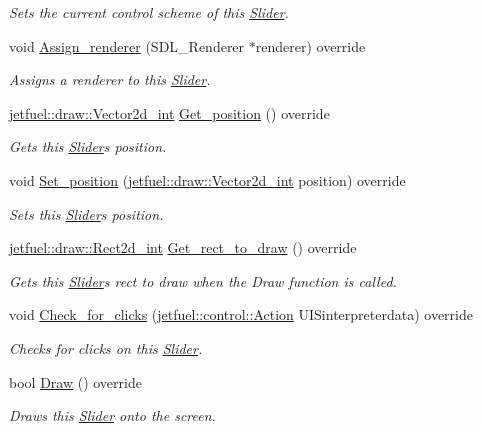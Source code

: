 \begin{DoxyCompactItemize}
\begin{DoxyCompactList}\small\item\em Sets the current control scheme of this \hyperlink{classjetfuel_1_1gui_1_1Slider}{Slider}. \end{DoxyCompactList}\item 
void \hyperlink{classjetfuel_1_1gui_1_1Slider_af9ceba04fec0f7cdc097ea0513094176}{Assign\+\_\+renderer} (S\+D\+L\+\_\+\+Renderer $\ast$renderer) override
\begin{DoxyCompactList}\small\item\em Assigns a renderer to this \hyperlink{classjetfuel_1_1gui_1_1Slider}{Slider}. \end{DoxyCompactList}\item 
\hyperlink{classjetfuel_1_1draw_1_1Vector2d}{jetfuel\+::draw\+::\+Vector2d\+\_\+int} \hyperlink{classjetfuel_1_1gui_1_1Slider_a2b177c832a42ad21ca1fa88496ef7551}{Get\+\_\+position} () override
\begin{DoxyCompactList}\small\item\em Gets this \hyperlink{classjetfuel_1_1gui_1_1Slider}{Slider}\textquotesingle{}s position. \end{DoxyCompactList}\item 
void \hyperlink{classjetfuel_1_1gui_1_1Slider_a11721a72699e9d1cdd0f6e5709f003e4}{Set\+\_\+position} (\hyperlink{classjetfuel_1_1draw_1_1Vector2d}{jetfuel\+::draw\+::\+Vector2d\+\_\+int} position) override
\begin{DoxyCompactList}\small\item\em Sets this \hyperlink{classjetfuel_1_1gui_1_1Slider}{Slider}\textquotesingle{}s position. \end{DoxyCompactList}\item 
\hyperlink{classjetfuel_1_1draw_1_1Rect2d}{jetfuel\+::draw\+::\+Rect2d\+\_\+int} \hyperlink{classjetfuel_1_1gui_1_1Slider_abab31dbe01b716b4e82919f0d8aba96c}{Get\+\_\+rect\+\_\+to\+\_\+draw} () override
\begin{DoxyCompactList}\small\item\em Gets this \hyperlink{classjetfuel_1_1gui_1_1Slider}{Slider}\textquotesingle{}s rect to draw when the Draw function is called. \end{DoxyCompactList}\item 
void \hyperlink{classjetfuel_1_1gui_1_1Slider_a8a1e83cfea8d65db34da7447dce9fb6f}{Check\+\_\+for\+\_\+clicks} (\hyperlink{structjetfuel_1_1control_1_1Action}{jetfuel\+::control\+::\+Action} U\+I\+Sinterpreterdata) override
\begin{DoxyCompactList}\small\item\em Checks for clicks on this \hyperlink{classjetfuel_1_1gui_1_1Slider}{Slider}. \end{DoxyCompactList}\item 
bool \hyperlink{classjetfuel_1_1gui_1_1Slider_a483038c689276ed8468e990977e5a74a}{Draw} () override
\begin{DoxyCompactList}\small\item\em Draws this \hyperlink{classjetfuel_1_1gui_1_1Slider}{Slider} onto the screen. \end{DoxyCompactList}\end{DoxyCompactItemize}
